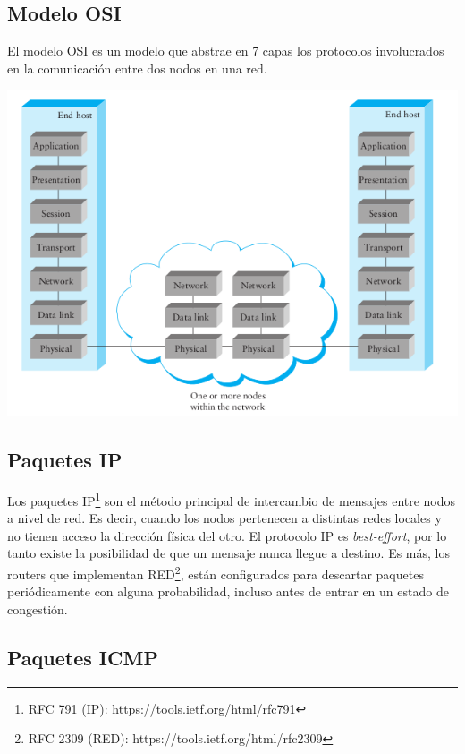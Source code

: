 \subsection{Modelo OSI}

El modelo OSI es un modelo que abstrae en 7 capas los protocolos involucrados en la comunicación entre dos nodos en una red.

\begin{center}
\includegraphics[width=\textwidth/2]{imgs/osi.png}
\end{center}

\subsection{Paquetes IP}

Los paquetes IP\footnote{RFC 791 (IP): https://tools.ietf.org/html/rfc791} son el método principal de intercambio de mensajes entre nodos a nivel de red. Es decir, cuando los nodos pertenecen a distintas redes locales y no tienen acceso la dirección física del otro. El protocolo IP es \textit{best-effort}, por lo tanto existe la posibilidad de que un mensaje nunca llegue a destino. Es más, los routers que implementan RED\footnote{RFC 2309 (RED): https://tools.ietf.org/html/rfc2309}, están configurados para descartar paquetes periódicamente con alguna probabilidad, incluso antes de entrar en un estado de congestión.

\subsection{Paquetes ICMP}


